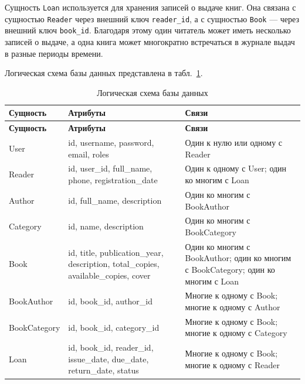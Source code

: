 Сущность \texttt{Loan} используется для хранения записей о выдаче книг. Она
связана с сущностью \texttt{Reader} через внешний ключ \texttt{reader\_id}, а с
сущностью \texttt{Book} --- через внешний ключ \texttt{book\_id}. Благодаря этому
один читатель может иметь несколько записей о выдаче, а одна книга может
многократно встречаться в журнале выдач в разные периоды времени.

Логическая схема базы данных представлена в табл.~\ref{tab:logical_schema}.

{
\coursetablesetup
\setlength{\LTleft}{0pt}
\setlength{\LTright}{0pt}

\begin{longtable}{|
p{}|
p{}|
p{}|}
    \caption{Логическая схема базы данных}
    \label{tab:logical_schema} \\

    \hline
    \textbf{Сущность} & \textbf{Атрибуты} & \textbf{Связи} \\ \hline
    \endfirsthead

    \tabcont{\ref{tab:logical_schema}}
    \textbf{Сущность} & \textbf{Атрибуты} & \textbf{Связи} \\ \hline
    \endhead

    \hline
    \endfoot

    User &
    id, username, password, email, roles &
    Один к нулю или одному с Reader \\ \hline

    Reader &
    id, user\_id, full\_name, phone, registration\_date &
    Один к одному с User; один ко многим с Loan \\ \hline

    Author &
    id, full\_name, description &
    Один ко многим с BookAuthor \\ \hline

    Category &
    id, name, description &
    Один ко многим с BookCategory \\ \hline

    Book &
    id, title, publication\_year, description, total\_copies, available\_copies, cover &
    Один ко многим с BookAuthor; один ко многим с BookCategory; один ко многим с Loan \\ \hline

    BookAuthor &
    id, book\_id, author\_id &
    Многие к одному с Book; многие к одному с Author \\ \hline

    BookCategory &
    id, book\_id, category\_id &
    Многие к одному с Book; многие к одному с Category \\ \hline

    Loan &
    id, book\_id, reader\_id, issue\_date, due\_date, return\_date, status &
    Многие к одному с Book; многие к одному с Reader \\ \hline
\end{longtable}
}


